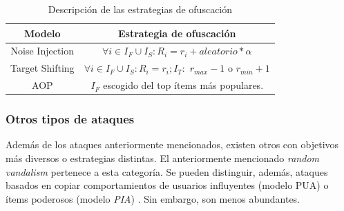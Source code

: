 \begin{table}
	
	\centering
	\resizebox{15cm}{!} {
		\begin{tabular}{|c c|}
			\hline
			
			Modelo & Estrategia de ofuscación\\\hline \hline
			
			Noise Injection & $\forall i \in I_F \cup I_S: R_i = r_i + aleatorio * \alpha $\\\hline 
			Target Shifting & $\forall i \in I_F \cup I_S: R_i = r_i; I_T:$ $r_{max}-1$ o $r_{min}+1$ \\\hline 
			AOP & $I_F$ escogido del top ítems más populares.\\\hline 
		\end{tabular}
	}
	
	\caption{Descripción de las estrategias de ofuscación}
	\label{tabla_descripcion_estrategias_ofuscación}
	
\end{table}

\subsubsection{Otros tipos de ataques}

Además de los ataques anteriormente mencionados, existen otros con objetivos más diversos o estrategias distintas. El anteriormente mencionado \textit{random vandalism} pertenece a esta categoría. Se pueden distinguir, además, ataques basados en copiar comportamientos de usuarios influyentes (modelo PUA) o ítems poderosos (modelo \textit{PIA}) \cite{mingdan2018ShillingAttacksAReview}. Sin embargo, son menos abundantes.


